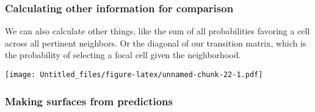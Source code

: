 \documentclass[
]{article}
\newenvironment{Shaded}{\begin{snugshade}}{\end{snugshade}}
\newcommand{\AttributeTok}[1]{\textcolor[rgb]{0.77,0.63,0.00}{#1}}
\newcommand{\ControlFlowTok}[1]{\textcolor[rgb]{0.13,0.29,0.53}{\textbf{#1}}}
\newcommand{\DecValTok}[1]{\textcolor[rgb]{0.00,0.00,0.81}{#1}}
\newcommand{\FloatTok}[1]{\textcolor[rgb]{0.00,0.00,0.81}{#1}}
\newcommand{\FunctionTok}[1]{\textcolor[rgb]{0.00,0.00,0.00}{#1}}
\newcommand{\NormalTok}[1]{#1}
\newcommand{\OtherTok}[1]{\textcolor[rgb]{0.56,0.35,0.01}{#1}}
\newcommand{\SpecialCharTok}[1]{\textcolor[rgb]{0.00,0.00,0.00}{#1}}
\newcommand{\StringTok}[1]{\textcolor[rgb]{0.31,0.60,0.02}{#1}}
\begin{document}
\hypertarget{calculating-other-information-for-comparison}{%
\subsubsection{Calculating other information for
comparison}\label{calculating-other-information-for-comparison}}

We can also calculate other things, like the sum of all probabilities
favoring a cell across all pertinent neighbors. Or the diagonal of our
transition matrix, which is the probability of selecting a focal cell
given the neighborhood.

\begin{Shaded}
\end{Shaded}

\texttt{[image: Untitled\_files/figure-latex/unnamed-chunk-22-1.pdf]}

\hypertarget{making-surfaces-from-predictions}{%
\subsubsection{Making surfaces from
predictions}\label{making-surfaces-from-predictions}}
\end{document}
